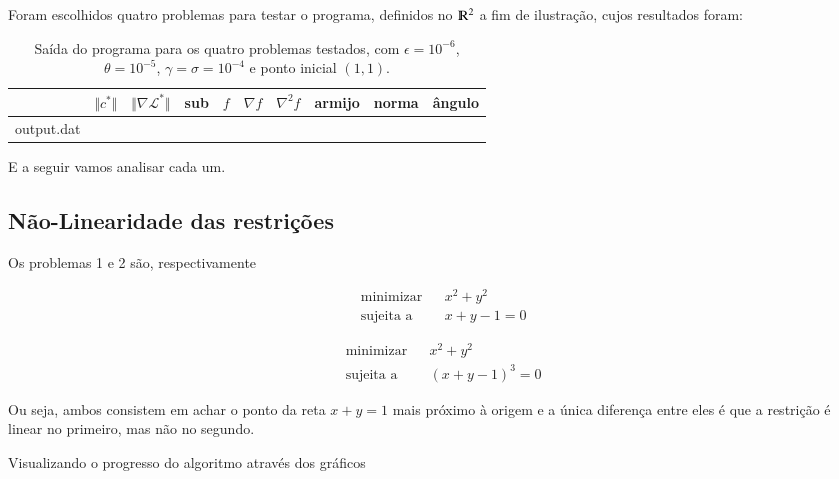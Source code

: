 Foram escolhidos quatro problemas para testar o programa, definidos no $\varmathbb{R}^2$
a fim de ilustração, cujos resultados foram:

\begin{table}[h!]
    \centering
	\label{tab:resultados}
    \begin{tabular}{r|rrrrrrrrr}
         & $\Vert c^*\Vert$ & $\Vert\nabla \mathcal{L}^*\Vert$ & sub & $f$ & $\nabla f $ & $\nabla^2f$ & armijo & norma & ângulo \\
        \hline
        {output.dat}
    \end{tabular}
    \caption{Saída do programa para os quatro problemas testados, com
	$\epsilon = 10^{-6}$, $\theta = 10^{-5} $, $\gamma = \sigma = 10^{-4}$ e
	ponto inicial $(1, 1)$.}
\end{table}

E a seguir vamos analisar cada um.

\subsection{Não-Linearidade das restrições}
    Os problemas 1 e 2 são, respectivamente

    \noindent\begin{minipage}{.5\linewidth}
        \begin{equation*}
			\begin{aligned}
				& \text{minimizar} & & x^2 + y^2 \\
				& \text{sujeita a} & & x + y - 1 = 0
			\end{aligned}
        \end{equation*}
    \end{minipage}%
    \begin{minipage}{.5\linewidth}
        \begin{equation*}
			\begin{aligned}
				& \text{minimizar} & & x^2 + y^2 \\
				& \text{sujeita a} & & (x + y - 1)^3 = 0
			\end{aligned}
        \end{equation*}
    \end{minipage}

	Ou seja, ambos consistem em achar o ponto da reta $x + y = 1$ mais próximo
	à origem e a única diferença entre eles é que a restrição é linear no primeiro,
	mas não no segundo.

	Visualizando o progresso do algoritmo através dos gráficos

